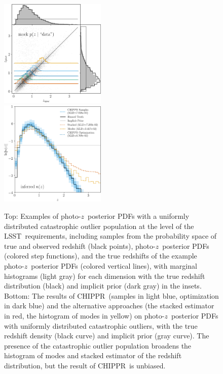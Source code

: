 \documentclass[iop]{emulateapj}
\newcommand{\todo}[3]{{\color{#2}\emph{#1}: #3}}
\newcommand{\aim}[1]{\todo{AIM}{red}{#1}}
\newcommand{\project}[1]{\textsc{#1}}
\newcommand{\lsst}{\project{LSST}}
\newcommand{\Chippr}{\project{CHIPPR}}%
\newcommand{\pz}{photo-$z$}
\newcommand{\pzpdf}{\pz\ posterior PDF}%
\begin{document}
\begin{figure}
	\begin{center}
	\includegraphics[width=0.45\textwidth]{figures/chippr/single_uout-mega_scatter.png}\\
	\includegraphics[width=0.45\textwidth]{figures/chippr/single_uout_log_estimators.png}
	\caption{
		Top: Examples of \pzpdf s with a uniformly distributed catastrophic outlier population at the level of the \lsst\ requirements, including samples from the probability space of true and observed redshift (black points), \pzpdf s (colored step functions), and the true redshifts of the example \pzpdf s (colored vertical lines), with marginal histograms (light gray) for each dimension with the true redshift distribution (black) and implicit prior (dark gray) in the insets.
		Bottom: The results of \Chippr\ (samples in light blue, optimization in dark blue) and the alternative approaches (the stacked estimator in red, the histogram of modes in yellow) on \pzpdf s with uniformly distributed catastrophic outliers, with the true redshift density (black curve) and implicit prior (gray curve).
		The presence of the catastrophic outlier population broadens the histogram of modes and stacked estimator of the redshift distribution, but the result of \Chippr\ is unbiased.
	}
	\label{fig:uniform-outliers}
	\end{center}
\end{figure}
\end{document}
